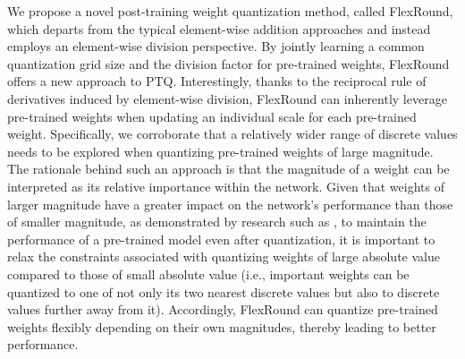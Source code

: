 \documentclass{article}
\theoremstyle{plain}
\theoremstyle{definition}
\theoremstyle{remark}
\begin{document}
We propose a novel post-training weight quantization method, called FlexRound, which departs from the typical element-wise addition approaches and instead employs an element-wise division perspective.
By jointly learning a common quantization grid size and the division factor for pre-trained weights, FlexRound offers a new approach to PTQ.
Interestingly, thanks to the reciprocal rule of derivatives induced by element-wise division, FlexRound can inherently leverage pre-trained weights when updating an individual scale for each pre-trained weight. Specifically, we corroborate that a relatively wider range of discrete values needs to be explored when quantizing pre-trained weights of large magnitude. The rationale behind such an approach is that the magnitude of a weight can be interpreted as its relative importance within the network. Given that weights of larger magnitude have a greater impact on the network's performance than those of smaller magnitude, as demonstrated by research such as \citep{han2016deep}, to maintain the performance of a pre-trained model even after quantization,
it is important to relax the constraints associated with quantizing weights of large absolute value compared to those of small absolute value (i.e., important weights can be quantized to one of not only its two nearest discrete values but also to discrete values further away from it). Accordingly, FlexRound can quantize pre-trained weights flexibly depending on their own magnitudes, %
thereby leading to better performance.
\end{document}
